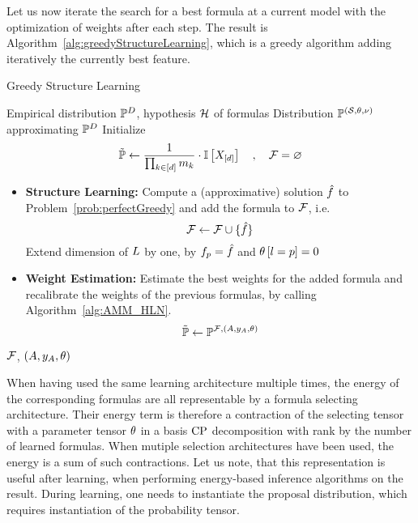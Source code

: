 
Let us now iterate the search for a best formula at a current model with the optimization of weights after each step.
The result is Algorithm~\ref{alg:greedyStructureLearning}, which is a greedy algorithm adding iteratively the currently best feature.

\begin{algorithm}[hbt!]
    \caption{Greedy Structure Learning}\label{alg:greedyStructureLearning}
    \begin{algorithmic}
        \Require Empirical distribution $\mathbb{P}^{D}$, hypothesis $\mathcal{H}$ of formulas
        \Ensure Distribution $\mathbb{P}^{(\mathcal{S},\theta,\nu)}$ approximating $\mathbb{P}^{D}$
        \iosepline
        \State Initialize
        \[ \tilde{\mathbb{P}} \leftarrow \frac{1}{\prod_{k\in[d]}m_{k}} \cdot \mathbb{I}\left[X_{[d]}\right] \quad, \quad \mathcal{F} = \varnothing \]
            \State
            \begin{itemize}
                \item \textbf{Structure Learning:} Compute a (approximative) solution $\hat{f}$ to Problem~\eqref{prob:perfectGreedy} and add the formula to $\mathcal{F}$, i.e.
                \[ \mathcal{F} \leftarrow \mathcal{F} \cup\{\hat{f}\} \]
                Extend dimension of $L$ by one, by $f_{p}=\hat{f}$ and $\theta\left[l=p\right]=0$
                \item \textbf{Weight Estimation:} Estimate the best weights for the added formula and recalibrate the weights of the previous formulas, by calling Algorithm~\ref{alg:AMM_HLN}.
                \[ \tilde{\mathbb{P}} \leftarrow \mathbb{P}^{\mathcal{F},(A,y_{A},\theta)} \]
            \end{itemize}
        \EndWhile
        \State \Return $\mathcal{F}$, $(A,y_{A},\theta)$ %
    \end{algorithmic}
\end{algorithm}


When having used the same learning architecture multiple times, the energy of the corresponding formulas are all representable by a formula selecting architecture.
Their energy term is therefore a contraction of the selecting tensor with a parameter tensor $\theta$ in a basis $\mathrm{CP}$ decomposition with rank by the number of learned formulas.
When mutiple selection architectures have been used, the energy is a sum of such contractions.
% 
Let us note, that this representation is useful after learning, when performing energy-based inference algorithms on the result.
During learning, one needs to instantiate the proposal distribution, which requires instantiation of the probability tensor.


